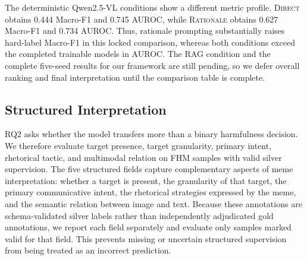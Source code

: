 The deterministic Qwen2.5-VL conditions show a different metric profile.
\textsc{Direct} obtains 0.444 Macro-F1 and 0.745 AUROC, while
\textsc{Rationale} obtains 0.627 Macro-F1 and 0.734 AUROC.
Thus, rationale prompting substantially raises hard-label Macro-F1 in this
locked comparison, whereas both conditions exceed the completed trainable
models in AUROC.  The \textsc{RAG} condition and the complete five-seed
results for our framework are still pending, so we defer overall ranking and
final interpretation until the comparison table is complete.

\subsection{Structured Interpretation}
\label{sec:results:structured}

RQ2 asks whether the model transfers more than a binary harmfulness
decision.
We therefore evaluate target presence, target granularity, primary intent,
rhetorical tactic, and multimodal relation on FHM samples with valid silver
supervision.
The five structured fields capture complementary aspects of meme
interpretation: whether a target is present, the granularity of that target,
the primary communicative intent, the rhetorical strategies expressed by the
meme, and the semantic relation between image and text.
Because these annotations are schema-validated silver labels rather than
independently adjudicated gold annotations, we report each field separately
and evaluate only samples marked valid for that field.
This prevents missing or uncertain structured supervision from being treated
as an incorrect prediction.

\begin{table}[t]
    \caption{
    Structured interpretation on schema-validated FHM silver annotations.
    Metrics are computed only over samples with valid field-level
    supervision; valid-sample counts and coverage are reported in the
    supplementary material.
    }
    \label{tab:structured-results}
    \centering
    
\end{table}

%
